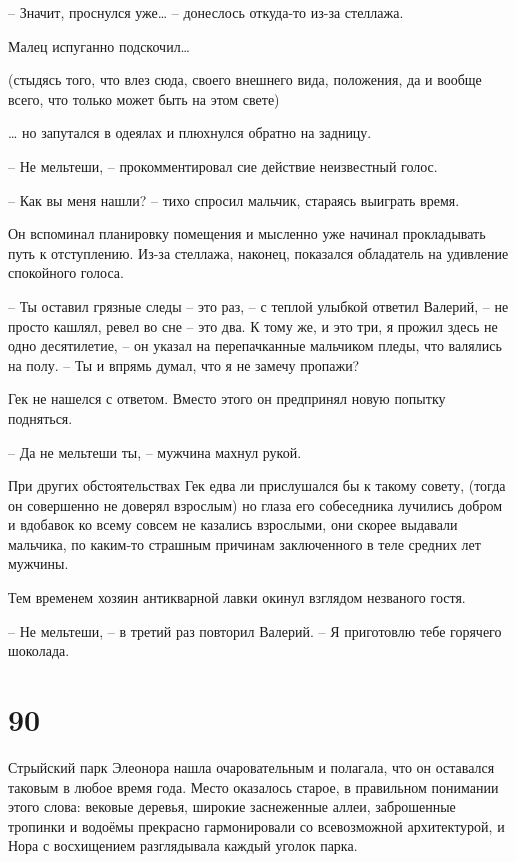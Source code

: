 \documentclass[
  a5paperpaper,
  DIV=11,
  numbers=noendperiod]{scrreprt}
\begin{document}
-- Значит, проснулся уже\ldots{} -- донеслось откуда-то из-за стеллажа.

Малец испуганно подскочил\ldots{}

(стыдясь того, что влез сюда, своего внешнего вида, положения, да и
вообще всего, что только может быть на этом свете)

\ldots{} но запутался в одеялах и плюхнулся обратно на задницу.

-- Не мельтеши, -- прокомментировал сие действие неизвестный голос.

-- Как вы меня нашли? -- тихо спросил мальчик, стараясь выиграть время.

Он вспоминал планировку помещения и мысленно уже начинал прокладывать
путь к отступлению. Из-за стеллажа, наконец, показался обладатель на
удивление спокойного голоса.

-- Ты оставил грязные следы -- это раз, -- с теплой улыбкой ответил
Валерий, -- не просто кашлял, ревел во сне -- это два. К тому же, и это
три, я прожил здесь не одно десятилетие, -- он указал на перепачканные
мальчиком пледы, что валялись на полу. -- Ты и впрямь думал, что я не
замечу пропажи?

Гек не нашелся с ответом. Вместо этого он предпринял новую попытку
подняться.

-- Да не мельтеши ты, -- мужчина махнул рукой.

При других обстоятельствах Гек едва ли прислушался бы к такому совету,
(тогда он совершенно не доверял взрослым) но глаза его собеседника
лучились добром и вдобавок ко всему совсем не казались взрослыми, они
скорее выдавали мальчика, по каким-то страшным причинам заключенного в
теле средних лет мужчины.

Тем временем хозяин антикварной лавки окинул взглядом незваного гостя.

-- Не мельтеши, -- в третий раз повторил Валерий. -- Я приготовлю тебе
горячего шоколада.

\section*{90}\label{90}


Стрыйский парк Элеонора нашла очаровательным и полагала, что он
оставался таковым в любое время года. Место оказалось старое, в
правильном понимании этого слова: вековые деревья, широкие заснеженные
аллеи, заброшенные тропинки и водоёмы прекрасно гармонировали со
всевозможной архитектурой, и Нора с восхищением разглядывала каждый
уголок парка.
\end{document}
